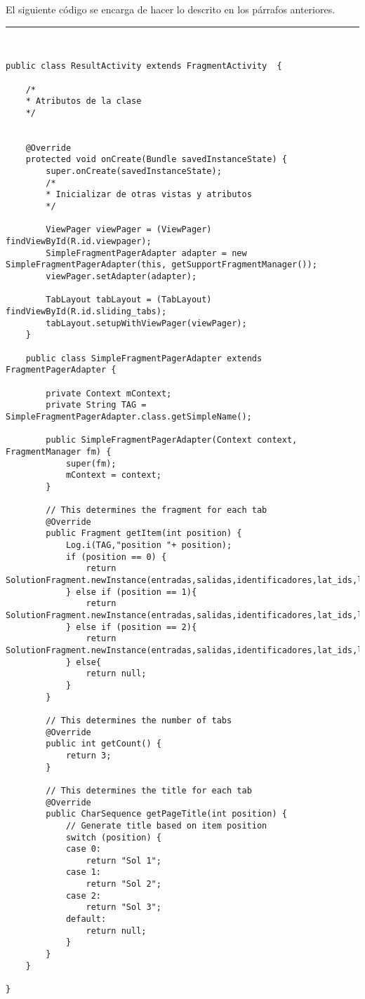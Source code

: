 El siguiente código se encarga de hacer lo descrito en los párrafos anteriores.\newline
\noindent\rule[-1ex]{\textwidth}{1pt}\\
\begin{lstlisting}[caption=Código de una vista con tabs dentro de ella.]
public class ResultActivity extends FragmentActivity  {

	/*
	* Atributos de la clase
	*/
	
	
	@Override
	protected void onCreate(Bundle savedInstanceState) {
		super.onCreate(savedInstanceState);
		/*
		* Inicializar de otras vistas y atributos
		*/
		
		ViewPager viewPager = (ViewPager) findViewById(R.id.viewpager);
		SimpleFragmentPagerAdapter adapter = new SimpleFragmentPagerAdapter(this, getSupportFragmentManager());
		viewPager.setAdapter(adapter);
		
		TabLayout tabLayout = (TabLayout) findViewById(R.id.sliding_tabs);
		tabLayout.setupWithViewPager(viewPager);
	}
	
	public class SimpleFragmentPagerAdapter extends FragmentPagerAdapter {
	
		private Context mContext;
		private String TAG = SimpleFragmentPagerAdapter.class.getSimpleName();
		
		public SimpleFragmentPagerAdapter(Context context, FragmentManager fm) {
			super(fm);
			mContext = context;
		}
		
		// This determines the fragment for each tab
		@Override
		public Fragment getItem(int position) {
			Log.i(TAG,"position "+ position);
			if (position == 0) {
				return SolutionFragment.newInstance(entradas,salidas,identificadores,lat_ids,lon_ids,lat_city,lon_city);
			} else if (position == 1){
				return SolutionFragment.newInstance(entradas,salidas,identificadores,lat_ids,lon_ids,lat_city,lon_city);
			} else if (position == 2){
				return SolutionFragment.newInstance(entradas,salidas,identificadores,lat_ids,lon_ids,lat_city,lon_city);
			} else{
				return null;
			}
		}
		
		// This determines the number of tabs
		@Override
		public int getCount() {
			return 3;
		}
		
		// This determines the title for each tab
		@Override
		public CharSequence getPageTitle(int position) {
			// Generate title based on item position
			switch (position) {
			case 0:
				return "Sol 1";
			case 1:
				return "Sol 2";
			case 2:
				return "Sol 3";
			default:
				return null;
			}
		}
	}

}
\end{lstlisting}
